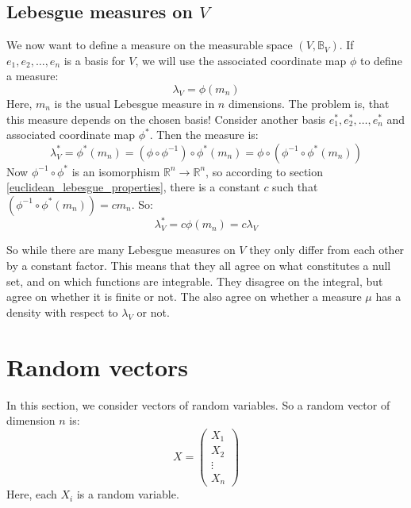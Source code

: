 \documentclass[12pt, a4paper]{article}
\numberwithin{equation}{section}
\begin{document}
\subsection{Lebesgue measures on $V$}
We now want to define a measure on the measurable space $(V,\mathbb{B}_V)$. If $e_1, e_2,\ldots, e_n$ is a basis for $V$, we will use the associated coordinate map $\phi$ to define a measure:
\begin{equation}
\lambda_V=\phi(m_n)
\end{equation}
Here, $m_n$ is the usual Lebesgue measure in $n$ dimensions. The problem is, that this measure depends on the chosen basis! Consider another basis $e^*_1, e^*_2,\ldots,e^*_n$ and associated coordinate map $\phi^*$. Then the measure is:
\begin{equation}
\lambda^*_V=\phi^*(m_n)=(\phi\circ\phi^{-1})\circ\phi^*(m_n)=\phi\circ(\phi^{-1}\circ\phi^*(m_n))
\end{equation}
Now $\phi^{-1}\circ\phi^*$ is an isomorphism $\mathbb{R}^n\rightarrow\mathbb{R}^n$, so according to section \ref{euclidean_lebesgue_properties}, there is a constant $c$ such that $(\phi^{-1}\circ\phi^*(m_n))=c m_n$. So:
\begin{equation}
\lambda^*_V=c\phi(m_n)=c\lambda_V
\end{equation}

So while there are many Lebesgue measures on $V$ they only differ from each other by a constant factor. This means that they all agree on what constitutes a null set, and on which functions are integrable. They disagree on the integral, but agree on whether it is finite or not. The also agree on whether a measure $\mu$ has a density with respect to $\lambda_V$ or not.



\section{Random vectors}
In this section, we consider vectors of random variables. So a random vector of dimension $n$ is:
\begin{equation}
X=
\begin{pmatrix}
X_1 \\ X_2 \\ \vdots \\ X_n
\end{pmatrix}
\end{equation}
Here, each $X_i$ is a random variable.
\end{document}
